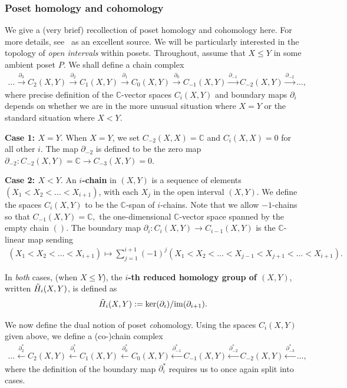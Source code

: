 \documentclass[ALCO, Unicode]{cedram}
\def \ker{\mathrm{ker}}
\def \im{\mathrm{im}}
\def\C{{\mathbb{C}}}
\begin{document}
\subsubsection{Poset homology and cohomology}\label{sec:poset-topology-conventions}
We give a (very brief) recollection of poset homology and cohomology here. For more details, see~\cite{WachsPosetTopology} as an excellent source. We will be particularly interested in the topology of \textit{open intervals} within posets. Throughout, assume that $X \leq Y$ in some ambient poset $P.$  We shall define a chain complex 
{\small \begin{align*}
 \ldots \xrightarrow{\partial_3} C_2(X, Y)\xrightarrow{\partial_2} C_1(X, Y)\xrightarrow{\partial_1} C_0(X, Y) \xrightarrow{\partial_0} C_{-1} (X, Y)\xrightarrow{\partial_{-1}} C_{-2}(X, Y) \xrightarrow{\partial_{-2}} \ldots,
\end{align*}}where precise definition of the $\C$-vector spaces $C_i(X, Y)$ and boundary maps $\partial_i$ depends on whether we are in the more unusual situation where $X = Y$ or the standard situation where $X < Y.$

{ \sf\bf{Case 1: $X = Y$}}. When $X = Y$, we set $C_{-2}(X, X) = \C$ and $C_{i}(X, X) = 0$ for all other $i.$ The map $\partial_{-2}$ is defined to be the zero map $\partial_{-2}:C_{-2}(X, Y) = \C \to C_{-3}(X, Y) = 0.$ 

{ \sf\bf{Case 2: $X < Y$}}.  An \textbf{$i$-chain} in $(X, Y)$ is a sequence of elements $(X_1 < X_2 < \ldots < X_{i + 1})$, with each $X_j$ in the open interval $(X, Y).$  We define the spaces $C_i(X, Y)$ to be the $\C$-span of $i$-chains. Note that we allow $ -1$-chains so that $C_{-1}(X, Y) = \C,$ the one-dimensional $\C$-vector space spanned by the empty chain $().$  The boundary map \textbf{$\partial_i: C_i(X, Y) \longrightarrow C_{i - 1}(X, Y)$} is the $\C$-linear map sending
\begin{align*}
    (X_1 < X_2 < \ldots < X_{i + 1}) \mapsto \sum_{j = 1}^{i + 1}(-1)^j (X_1 < X_2 < \ldots < X_{j - 1}< X_{j + 1}< \ldots  < X_{i + 1}).
\end{align*}
 
In \textit{both} cases, (when $X \leq Y$), the \textbf{$i$-th reduced homology group of $(X, Y)$}, written \textbf{$\Tilde{H}_i(X, Y)$}, is defined as \[\Tilde{H}_i(X, Y): = \ker(\partial_i) / \im(\partial_{i + 1}).\]

We now define the dual notion of poset \textit{co}homology. Using the spaces $C_i(X, Y)$ given above, we define a (co-)chain complex
{\small \begin{align*}
 \ldots \xleftarrow{\partial_2^\ast} C_2(X, Y)\xleftarrow{\partial_1^\ast} C_1(X, Y)\xleftarrow{\partial_0^\ast} C_{0}(X, Y) \xleftarrow{\partial_{-1}^\ast} C_{-1}(X, Y) \xleftarrow{\partial_{-2}^\ast} C_{-2}(X, Y) \xleftarrow{\partial_{-3}^\ast} \ldots,
\end{align*}}where the definition of the boundary map $\partial_i^\ast$ requires us to once again split into cases.
\end{document}

